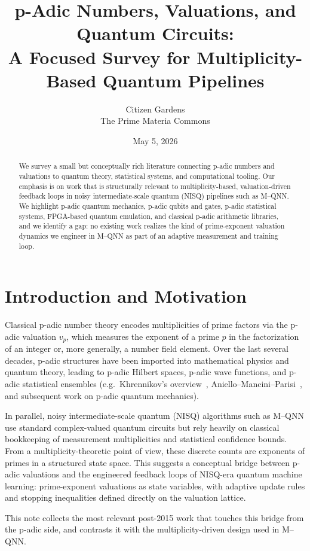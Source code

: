 \documentclass[11pt]{article}
\title{p-Adic Numbers, Valuations, and Quantum Circuits:\\
A Focused Survey for Multiplicity-Based Quantum Pipelines}
\author{Citizen Gardens \\ The Prime Materia Commons}
\date{May 5, 2026}
\begin{document}
\maketitle

\begin{abstract}
We survey a small but conceptually rich literature connecting p-adic numbers
and valuations to quantum theory, statistical systems, and computational
tooling. Our emphasis is on work that is structurally relevant to
multiplicity-based, valuation-driven feedback loops in noisy
intermediate-scale quantum (NISQ) pipelines such as M--QNN.
We highlight p-adic quantum mechanics, p-adic qubits and gates,
p-adic statistical systems, FPGA-based quantum emulation,
and classical p-adic arithmetic libraries, and we identify a gap:
no existing work realizes the kind of prime-exponent valuation dynamics
we engineer in M--QNN as part of an adaptive measurement and training loop.
\end{abstract}

\section{Introduction and Motivation}

Classical p-adic number theory encodes multiplicities of prime factors via
the p-adic valuation \(v_p\), which measures the exponent of a prime \(p\)
in the factorization of an integer or, more generally, a number field element.
Over the last several decades, p-adic structures have been imported into
mathematical physics and quantum theory, leading to p-adic Hilbert spaces,
p-adic wave functions, and p-adic statistical ensembles
(e.g.~Khrennikov's overview~\cite{khrennikov2017padic},
Aniello--Mancini--Parisi~\cite{aniello2023trace},
and subsequent work on p-adic quantum mechanics).

In parallel, noisy intermediate-scale quantum (NISQ) algorithms such as
M--QNN use standard complex-valued quantum circuits but rely heavily
on classical bookkeeping of measurement multiplicities and statistical
confidence bounds.
From a multiplicity-theoretic point of view, these discrete counts
are exponents of primes in a structured state space.  This suggests
a conceptual bridge between p-adic valuations and the engineered
feedback loops of NISQ-era quantum machine learning:
prime-exponent valuations as state variables, with adaptive update
rules and stopping inequalities defined directly on the valuation lattice.

This note collects the most relevant post-2015 work that touches this
bridge from the p-adic side, and contrasts it with the multiplicity-driven
design used in M--QNN.
\end{document}
